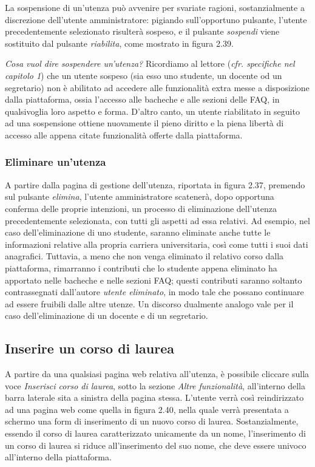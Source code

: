 \documentclass [a4paper,11pt]{book}
\begin{document}
La sospensione di un'utenza può avvenire per svariate ragioni, sostanzialmente a discrezione dell'utente amministratore: pigiando sull'opportuno pulsante, l'utente precedentemente selezionato risulterà sospeso, e il pulsante \emph{sospendi} viene sostituito dal pulsante \emph{riabilita}, come mostrato in figura 2.39.


\emph{Cosa vuol dire sospendere un'utenza?} Ricordiamo al lettore (\emph{cfr. specifiche nel capitolo 1}) che un utente sospeso (sia esso uno studente, un docente od un segretario) non è abilitato ad accedere alle funzionalità extra messe a disposizione dalla piattaforma, ossia l'accesso alle bacheche e alle sezioni delle FAQ, in qualsivoglia loro aspetto e forma. D'altro canto, un utente riabilitato in seguito ad una sospensione ottiene nuovamente il pieno diritto e la piena libertà di accesso alle appena citate funzionalità offerte dalla piattaforma.

\medskip

\subsubsection{Eliminare un'utenza}

A partire dalla pagina di gestione dell'utenza, riportata in figura 2.37, premendo sul pulsante \emph{elimina}, l'utente amministratore scatenerà, dopo opportuna conferma delle proprie intenzioni, un processo di eliminazione dell'utenza precedentemente selezionata, con tutti gli aspetti ad essa relativi. Ad esempio, nel caso dell'eliminazione di uno studente, saranno eliminate anche tutte le informazioni relative alla propria carriera universitaria, così come tutti i suoi dati anagrafici. Tuttavia, a meno che non venga eliminato il relativo corso dalla piattaforma, rimarranno i contributi che lo studente appena eliminato ha apportato nelle bacheche e nelle sezioni FAQ; questi contributi saranno soltanto contrassegnati dall'autore \emph{utente eliminato}, in modo tale che possano continuare ad essere fruibili dalle altre utenze. Un discorso dualmente analogo vale per il caso dell'eliminazione di un docente e di un segretario.

\medskip

\subsection{Inserire un corso di laurea}

A partire da una qualsiasi pagina web relativa all'utenza, è possibile cliccare sulla voce \emph{Inserisci corso di laurea}, sotto la sezione \emph{Altre funzionalità}, all'interno della barra laterale sita a sinistra della pagina stessa. L'utente verrà così reindirizzato ad una pagina web come quella in figura 2.40, nella quale verrà presentata a schermo una form di inserimento di un nuovo corso di laurea. Sostanzialmente, essendo il corso di laurea caratterizzato unicamente da un nome, l'inserimento di un corso di laurea si riduce all'inserimento del suo nome, che deve essere univoco all'interno della piattaforma.
\end{document}
